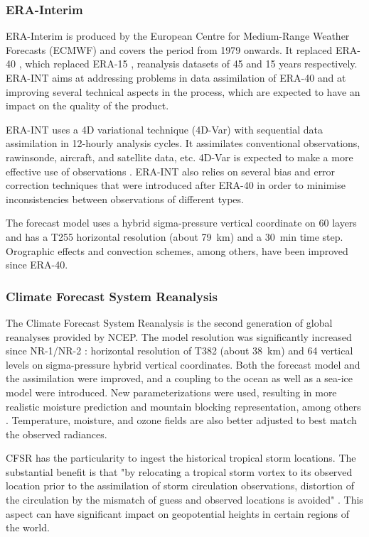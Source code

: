 \documentclass{ametsoc}
\begin{document}
\subsubsection{ERA-Interim}

ERA-Interim \citep[ERA-INT, ][]{Dee2011a} is produced by the European Centre for Medium-Range Weather Forecasts (ECMWF) and covers the period from 1979 onwards. It replaced ERA-40 \citep{Uppala2005}, which replaced ERA-15 \citep{Gibson1997}, reanalysis datasets of 45 and 15 years respectively. ERA-INT aims at addressing problems in data assimilation of ERA-40 and at improving several technical aspects in the process, which are expected to have an impact on the quality of the product.

ERA-INT uses a 4D variational technique (4D-Var) with sequential data assimilation in 12-hourly analysis cycles. It assimilates conventional observations, rawinsonde, aircraft, and satellite data, etc. 4D-Var is expected to make a more effective use of observations \citep{Dee2011a}. ERA-INT also relies on several bias and error correction techniques that were introduced after ERA-40 in order to minimise inconsistencies between observations of different types.

The forecast model uses a hybrid sigma-pressure vertical coordinate on 60 layers and has a T255 horizontal resolution (about 79~km) and a 30~min time step. Orographic effects and convection schemes, among others, have been improved since ERA-40.


\subsubsection{Climate Forecast System Reanalysis}

The Climate Forecast System Reanalysis \citep[CFSR, ][]{Saha2010a} is the second generation of global reanalyses provided by NCEP. The model resolution was significantly increased since NR-1/NR-2 : horizontal resolution of T382 (about 38~km) and 64 vertical levels on sigma-pressure hybrid vertical coordinates. Both the forecast model and the assimilation were improved, and a coupling to the ocean as well as a sea-ice model were introduced. New parameterizations were used, resulting in more realistic moisture prediction and mountain blocking representation, among others \citep{Saha2010a}. Temperature, moisture, and ozone fields are also better adjusted to best match the observed radiances.

CFSR has the particularity to ingest the historical tropical storm locations. The substantial benefit is that "by relocating a tropical storm vortex to its observed location prior to the assimilation of storm circulation observations, distortion of the circulation by the mismatch of guess and observed locations is avoided" \citep{Saha2010a}. This aspect can have significant impact on geopotential heights in certain regions of the world.
\end{document}
